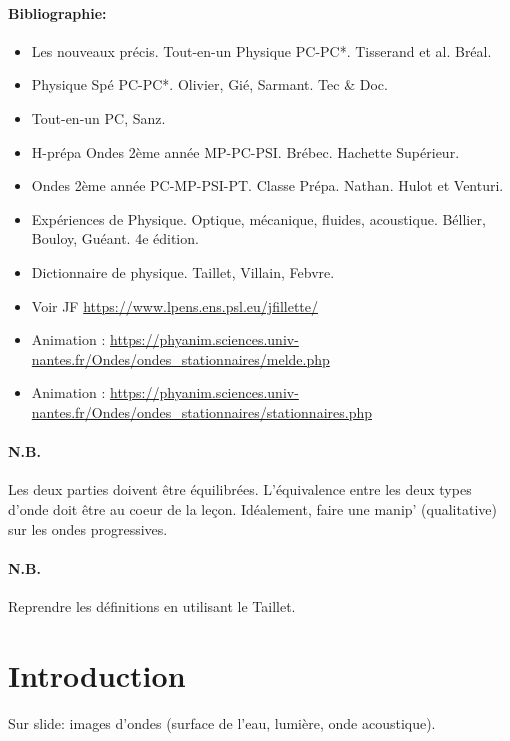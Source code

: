 \documentclass[11pt]{report}
\numberwithin{figure}{section}
\numberwithin{equation}{section}
\numberwithin{table}{section}
\newcommand{\1}{\boldsymbol{1}}
\begin{document}
\paragraph*{Bibliographie:}
\begin{itemize}
\item Les nouveaux précis. Tout-en-un Physique PC-PC*. Tisserand et al. Bréal.
\item Physique Spé PC-PC*. Olivier, Gié, Sarmant. Tec \& Doc.
\item Tout-en-un PC, Sanz.
\item H-prépa Ondes 2ème année MP-PC-PSI. Brébec. Hachette Supérieur.
\item Ondes 2ème année PC-MP-PSI-PT. Classe Prépa. Nathan. Hulot et Venturi. 
\item Expériences de Physique. Optique, mécanique, fluides, acoustique. Béllier, Bouloy, Guéant. 4e édition.
\item Dictionnaire de physique. Taillet, Villain, Febvre.
\item Voir JF \url{https://www.lpens.ens.psl.eu/jfillette/}
\item Animation : \url{https://phyanim.sciences.univ-nantes.fr/Ondes/ondes_stationnaires/melde.php}
\item Animation : \url{https://phyanim.sciences.univ-nantes.fr/Ondes/ondes_stationnaires/stationnaires.php}
\end{itemize}

\paragraph*{N.B.} \textcolor{mycolor5}{Les deux parties doivent être équilibrées. L'équivalence entre les deux types d'onde doit être au coeur de la leçon. Idéalement, faire une manip' (qualitative) sur les ondes progressives.}

\paragraph*{N.B.} \textcolor{mycolor5}{Reprendre les définitions en utilisant le Taillet.}

\section*{Introduction}
  
Sur slide: images d'ondes (surface de l'eau, lumière, onde acoustique).  
  
\end{document}
